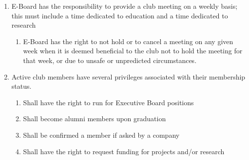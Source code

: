 

\begin{enumerate}
  \item E-Board has the responsibility to provide a club meeting on a weekly
    basis; this must include a time dedicated to education and a time dedicated
    to research
  \begin{enumerate}
    \item E-Board has the right to not hold or to cancel a meeting on any given
      week when it is deemed beneficial to the club not to hold the meeting for
      that week, or due to unsafe or unpredicted circumstances.
  \end{enumerate}
  \item Active club members have several privileges associated with their
    membership status.
  \begin{enumerate}
    \item Shall have the right to run for Executive Board positions
    \item Shall become alumni members upon graduation
    \item Shall be confirmed a member if asked by a company
    \item Shall have the right to request funding for projects and/or research
  \end{enumerate}
\end{enumerate}